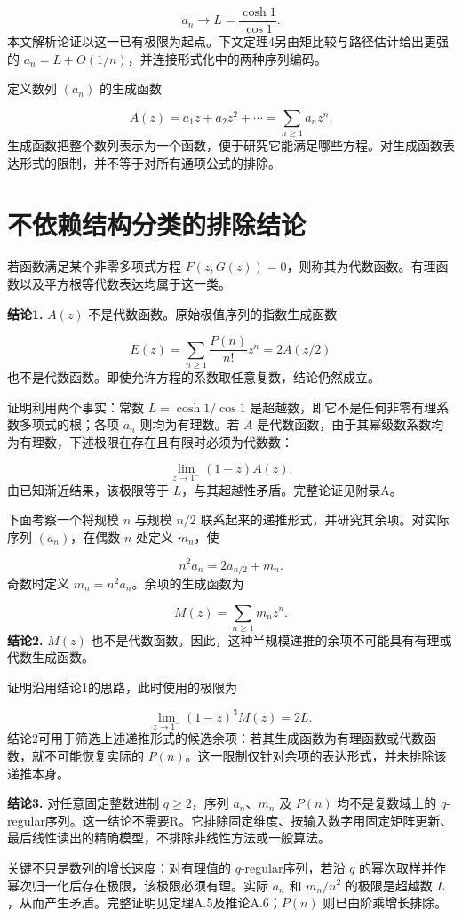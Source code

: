\documentclass[UTF8,11pt,fontset=fandol]{ctexart}
\begin{document}
\[
a_n\longrightarrow L=\frac{\cosh1}{\cos1}.
\]
本文解析论证以这一已有极限为起点。下文定理4另由矩比较与路径估计给出更强的 $a_n=L+O(1/n)$，并连接形式化中的两种序列编码。

定义数列 $(a_n)$ 的生成函数

\[
A(z)=a_1z+a_2z^2+\cdots=\sum_{n\ge1}a_nz^n.
\]
生成函数把整个数列表示为一个函数，便于研究它能满足哪些方程。对生成函数表达形式的限制，并不等于对所有通项公式的排除。

\section{不依赖结构分类的排除结论}
若函数满足某个非零多项式方程 $F(z,G(z))=0$，则称其为代数函数。有理函数以及平方根等代数表达均属于这一类。

\textbf{结论1.} $A(z)$ 不是代数函数。原始极值序列的指数生成函数

\[
E(z)=\sum_{n\ge1}\frac{P(n)}{n!}z^n=2A(z/2)
\]
也不是代数函数。即使允许方程的系数取任意复数，结论仍然成立。

证明利用两个事实：常数 $L=\cosh1/\cos1$ 是超越数，即它不是任何非零有理系数多项式的根；各项 $a_n$ 则均为有理数。若 $A$ 是代数函数，由于其幂级数系数均为有理数，下述极限在存在且有限时必须为代数数：

\[
\lim_{z\to1^-}(1-z)A(z).
\]
由已知渐近结果，该极限等于 $L$，与其超越性矛盾。完整论证见附录A。

下面考察一个将规模 $n$ 与规模 $n/2$ 联系起来的递推形式，并研究其余项。对实际序列 $(a_n)$，在偶数 $n$ 处定义 $m_n$，使

\[
n^2a_n=2a_{n/2}+m_n.
\]
奇数时定义 $m_n=n^2a_n$。余项的生成函数为

\[
M(z)=\sum_{n\ge1}m_nz^n.
\]
\textbf{结论2.} $M(z)$ 也不是代数函数。因此，这种半规模递推的余项不可能具有有理或代数生成函数。

证明沿用结论1的思路，此时使用的极限为

\[
\lim_{z\to1^-}(1-z)^3M(z)=2L.
\]
结论2可用于筛选上述递推形式的候选余项：若其生成函数为有理函数或代数函数，就不可能恢复实际的 $P(n)$。这一限制仅针对余项的表达形式，并未排除该递推本身。

\textbf{结论3.} 对任意固定整数进制 $q\ge2$，序列 $a_n$、$m_n$ 及 $P(n)$ 均不是复数域上的 $q$-regular序列。这一结论不需要R。它排除固定维度、按输入数字用固定矩阵更新、最后线性读出的精确模型，不排除非线性方法或一般算法。

关键不只是数列的增长速度：对有理值的 $q$-regular序列，若沿 $q$ 的幂次取样并作幂次归一化后存在极限，该极限必须有理。实际 $a_n$ 和 $m_n/n^2$ 的极限是超越数 $L$，从而产生矛盾。完整证明见定理A.5及推论A.6；$P(n)$ 则已由阶乘增长排除。
\end{document}
